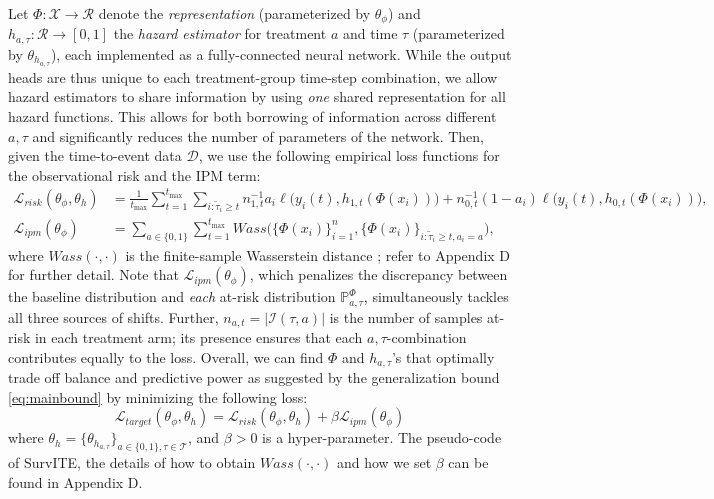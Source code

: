 \documentclass{article}
\newcommand{\Xc}{{\mathcal X}}
\newcommand{\Tc}{{\mathcal T}}
\newcommand{\loss}{{\mathcal L}}
\newcommand{\data}{{\mathcal D}}
\newcommand{\proposed}{{SurvITE}}
\newcommand{\minus}{{-}} %
\newcommand{\tmax}{{t_{\text{max}}}}
\begin{document}
Let $\Phi:\Xc \rightarrow \mathcal{R}$ denote the \textit{representation} (parameterized by $\theta_{\phi}$) and $h_{a, \tau}: \mathcal{R} \rightarrow [0,1]$ the \textit{hazard estimator} for treatment $a$ and time $\tau$ (parameterized by $\theta_{h_{a, \tau}}$), each implemented as a fully-connected neural network. While the output heads are thus unique to each treatment-group time-step combination, we allow hazard estimators to share information by using \textit{one} shared representation for all hazard functions. This allows for both borrowing of information across different $a, \tau$ and significantly reduces the number of parameters of the network. Then, given the time-to-event data $\data$, we use the following empirical loss functions for the observational risk and the IPM term: 
\begin{equation} \nonumber
\begin{split}
    \loss_{risk}(\theta_{\phi}, \theta_{h}) &= \frac{1}{\tmax}\sum_{t=1}^{\tmax}\!\sum_{i: \tilde{\tau}_{i} \geq t} n^{-1}_{1, t} a_{i}\ell\big(y_{i}(t), {h}_{1,t}({\Phi}(x_{i}) ) \big) + n^{-1}_{0, t}(1\minus a_{i})\ell\big(y_{i}(t), {h}_{0,t}({\Phi}(x_{i}) ) \big), \\
    \loss_{ipm}(\theta_{\phi}) &= \sum_{a\in \{0,1\}} \sum_{t=1}^{\tmax} Wass\big( \{ {\Phi}(x_{i}) \}_{i=1}^{n}, \{  {\Phi}(x_{i}) \}_{i:\tilde{\tau}_{i} \geq t, a_{i}=a} \big),
\end{split}
\end{equation}
where $Wass(\cdot, \cdot)$ is the finite-sample Wasserstein distance \cite{cuturi2014wass}; refer to Appendix D for further detail. Note that $\loss_{ipm}(\theta_{\phi})$, which penalizes the discrepancy between the baseline distribution and \textit{each} at-risk distribution $\mathbb{P}^{\Phi}_{a, \tau}$, simultaneously tackles all three sources of shifts. Further, $n_{a, t}=|\mathcal{I}(\tau, a)|$ is the number of samples at-risk in each treatment arm; its presence ensures that each $a, \tau$-combination contributes equally to the loss. Overall, we can find ${\Phi}$ and ${h}_{a,\tau}$'s that optimally trade off balance and predictive power as suggested by the generalization bound \eqref{eq:mainbound} by minimizing the following loss:
\begin{equation} \label{eq:loss_target}
    \loss_{target}(\theta_{\phi}, \theta_{h}) = \loss_{risk}(\theta_{\phi}, \theta_{h}) + \beta \loss_{ipm}(\theta_{\phi})
\end{equation}
where $\theta_{h} = \{\theta_{h_{a, \tau}}\}_{a\in\{0,1\}, \tau \in \Tc} $, and $\beta > 0$ is a hyper-parameter.  
The pseudo-code of \proposed, the details of how to obtain $Wass(\cdot, \cdot)$ and how we set $\beta$ can be found in Appendix D.  
\end{document}
